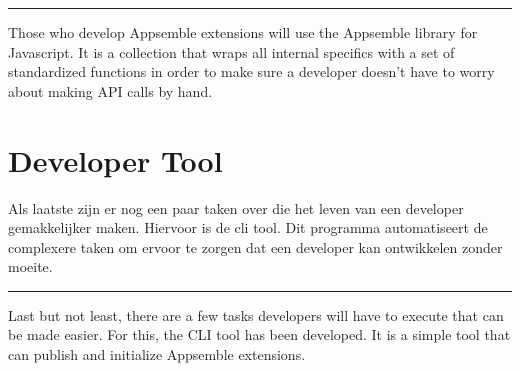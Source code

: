 \noindent\rule[0.5ex]{\linewidth}{1pt}

Those who develop Appsemble extensions will use the Appsemble library for Javascript.  It is a collection that  wraps all internal specifics with a set of standardized functions in order to make sure a developer doesn't have to worry about making API calls by hand.

\section{Developer Tool}

Als laatste zijn er nog een paar taken over die het leven van een developer gemakkelijker maken. Hiervoor is de cli tool. Dit programma automatiseert de complexere taken om ervoor te zorgen dat een developer kan ontwikkelen zonder moeite.

\noindent\rule[0.5ex]{\linewidth}{1pt}

Last but not least, there are a few tasks developers will have to execute that can be made easier. For this, the CLI tool has been developed. It is a simple tool that can publish and initialize Appsemble extensions.